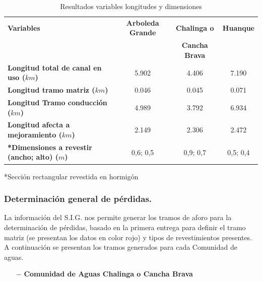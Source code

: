 \documentclass[]{article}
\begin{document}
\begin{table}[H]
\caption{Resultados variables longitudes y dimensiones}
\begin{tabular}{|l|ccc|}
\hline
\textbf{Variables}  & \textbf{Arboleda Grande} & \textbf{Chalinga o} & \textbf{Huanque} \\
 & & \textbf{Cancha Brava} &  \\ \hline                          
\textbf{Longitud total de canal en uso ($km$)}   & 5.902    & 4.406    & 7.190  \\
\textbf{Longitud tramo matriz ($km$)}  & 0.046    & 0.045    & 0.071    \\
\textbf{Longitud Tramo conducción ($km$)}  & 4.989  & 3.792  & 6.934   \\
\textbf{Longitud afecta a mejoramiento ($km$)}   & 2.149     & 2.306   & 2.472  \\
\textbf{*Dimensiones a revestir  (ancho; alto) ($m$)} & 0,6; 0,5 & 0,9; 0,7 & 0,5; 0,4\\ 
\hline
\end{tabular}
\small{*Sección rectangular revestida en hormigón}\\
\end{table}

\subsubsection{Determinación general de pérdidas.}

La información del S.I.G. nos permite generar los tramos de aforo para la determinación de pérdidas, basado en la primera entrega para definir el tramo matriz (se presentan los datos en color rojo) y tipos de revestimientos presentes. A continuación se presentan los tramos generados para cada Comunidad de aguas.

\begin{itemize}
	\item[$-$] \textbf{Comunidad de Aguas Chalinga o Cancha Brava}
\end{itemize}
\end{document}
